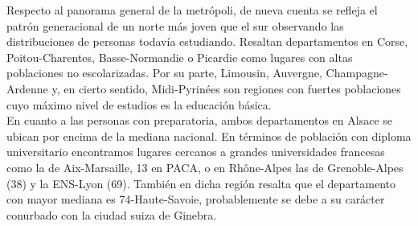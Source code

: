  Respecto al panorama general de la metrópoli, de nueva cuenta se refleja el patrón generacional de un norte más joven que el sur observando las distribuciones de personas todavía estudiando. Resaltan departamentos en Corse, Poitou-Charentes, Basse-Normandie o Picardie como lugares con altas poblaciones no escolarizadas. Por su parte, Limousin, Auvergne, Champagne-Ardenne y, en cierto sentido, Midi-Pyrinées son regiones con fuertes poblaciones cuyo máximo nivel de estudios es la educación básica.\\ 
 
 En cuanto a las personas con preparatoria, ambos departamentos en Alsace se ubican por encima de la mediana nacional. En términos de población con diploma universitario encontramos lugares cercanos a grandes universidades francesas como la de Aix-Marsaille, 13 en PACA, o en Rhône-Alpes las de Grenoble-Alpes (38) y la ENS-Lyon (69). También en dicha región resalta que el departamento con mayor mediana es 74-Haute-Savoie, probablemente se debe a su carácter conurbado con la ciudad suiza de Ginebra.\\
 
